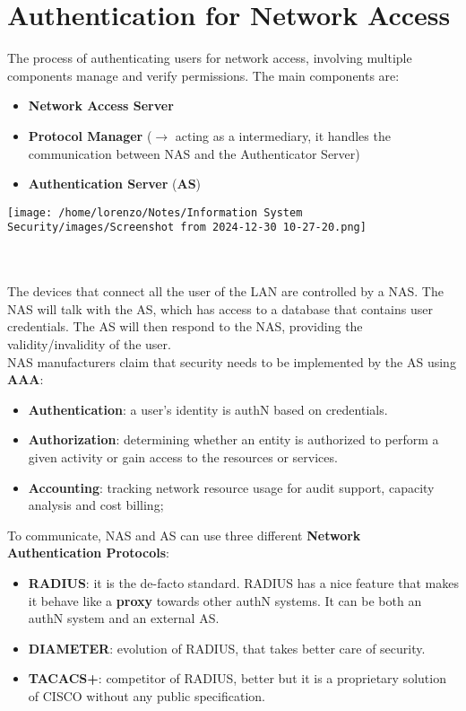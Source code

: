 \section{Authentication for Network Access}
\begin{minipage}{0.5\textwidth}
The process of authenticating users for network access, involving multiple components manage and verify permissions. The main components are:
\begin{itemize}
    \item \textbf{Network Access Server}
    \item \textbf{Protocol Manager} (\(\rightarrow \) acting as a intermediary, it handles the communication between NAS and the Authenticator Server)
    \item \textbf{Authentication Server}  (\textbf{AS}) 
\end{itemize}
\end{minipage} 
\hspace{0.3cm}
\begin{minipage}{0.5\textwidth}
    \centering
    \texttt{[image: /home/lorenzo/Notes/Information System Security/images/Screenshot from 2024-12-30 10-27-20.png]}
\end{minipage}
\\
\\
\noindent
The devices that connect all the user of the LAN are controlled by a NAS.
The NAS will talk with the AS, which has access to a database that contains user credentials.
The AS will then respond to the NAS, providing the validity/invalidity of the user.\\
\noindent
NAS manufacturers claim that security needs to be implemented by the AS using \textbf{AAA}:
\begin{itemize}
    \item \textbf{Authentication}: a user’s identity is authN based on credentials.
    \item \textbf{Authorization}: determining whether an entity is authorized to perform a given activity or gain access to the resources or services.
    \item \textbf{Accounting}: tracking network resource usage for audit support, capacity analysis and cost billing;
\end{itemize}
\noindent
To communicate, NAS and AS can use three different \textbf{Network Authentication Protocols}:
\begin{itemize}
    \item \textbf{RADIUS}: it is the de-facto standard. RADIUS has a nice feature that makes it behave like a \textbf{proxy} towards other authN systems. It can be both an authN system and an external AS.
    \item \textbf{DIAMETER}: evolution of RADIUS, that takes better care of security.
    \item \textbf{TACACS+}: competitor of RADIUS, better but it is a proprietary solution of CISCO without any public specification.
\end{itemize}
\newpage
